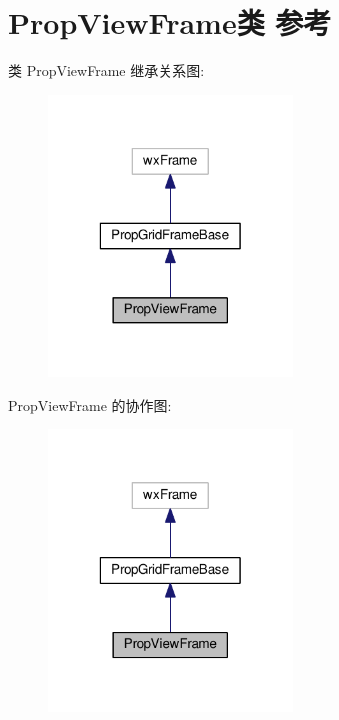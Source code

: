 \hypertarget{class_prop_view_frame}{\section{Prop\+View\+Frame类 参考}
\label{class_prop_view_frame}
}


类 Prop\+View\+Frame 继承关系图\+:
\nopagebreak
\begin{figure}[H]
\begin{center}
\leavevmode
\includegraphics[width=184pt]{class_prop_view_frame__inherit__graph}
\end{center}
\end{figure}


Prop\+View\+Frame 的协作图\+:
\nopagebreak
\begin{figure}[H]
\begin{center}
\leavevmode
\includegraphics[width=184pt]{class_prop_view_frame__coll__graph}
\end{center}
\end{figure}
